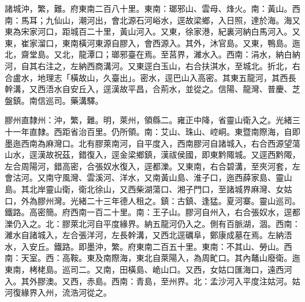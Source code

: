 \begin{pinyinscope}
諸城沖，繁，難。府東南二百八十里。東南：瑯邪山、雲母、烽火。南：黃山。西南：馬耳；九仙山，潮河出，會北源石河峪水，逕故梁鄉，入日照，達於海。海又東為宋家河口，距城百二十里，黃山河入。又東，徐家港，紀裏河納白馬河入。又東，崔家溜口，東南橫河東源自膠入，會西源入。其外，沐官島。又東，鴨島。迤北，齋堂島。又北，龍潭口；瑯邪臺在焉。至莒界，濰水入。西南：涓水，納白納河，自其右注之，左納西商溝河。又東逕白玉山，右合扶淇水，至城北。折北，右合盧水，地理志「橫故山，久臺出」。密水，逕巴山入高密。其東五龍河，其西長幹溝，又西浯水自安丘入，逕漢故平昌，合荊水，並從之。信陽、龍灣、普慶、芝盤鎮。南信巡司。藥溝驛。

膠州直隸州：沖，繁，難。明，萊州，領縣二。雍正中降，省靈山衛入之。光緒三十一年直隸。西距省治百里。仍所領。南：艾山、珠山、崆峒。東暨南際海，自即墨迤西南為麻灣口。北有膠萊南河，自平度入，西南膠河自諸城入，右合西源望蕩山水，逕漢故祝茲，錯復入，逕金梁鄉鎮，漢祓侯國，即東黔陬城。又逕西黔陬，左合周陽河，錯高密，合張奴水復入，逕都濼。又東南，右合碧溝，至夾河套，左會沽河。又南守風灣、雲溪河、洋水，又南黃山島、淮子口，迤西薛家島、靈山島。其北岸靈山衛，衛北徐山，又西柴湖蕩口、湘子門口，至諸城界麻灣、女姑口，外為膠州灣。光緒二十三年德人租之。鎮：古鎮、逢猛。夏河寨。靈山巡司。鐵路。高密簡。府西南一百二十里。南：王子山。膠河自州入，右合張奴水，逕都濼仍入之。北：膠萊北河自平度緣界。納五龍河仍入之。側有百脈湖，涸。西南：濰水自諸城入，左合張洋河，左長幹溝，又西北逕礪阜，鄭康成墓在焉。左納浯水，入安丘。鐵路。即墨沖，繁。府東南二百五十里。東南：不其山、勞山。西南：天室。西：高鞍。東及南際海，東北自萊陽入，為周甿口。其內鼇山廢衛。迤東南，栲栳島。巡司二。又南，田橫島、峗山口。又西，女姑口匯海口，遠西河入。其外膠澳。又西，赤島。西南：青島，至州界。北：孟沙河入平度注姑河。姑河復緣界入州，流浩河從之。


\end{pinyinscope}